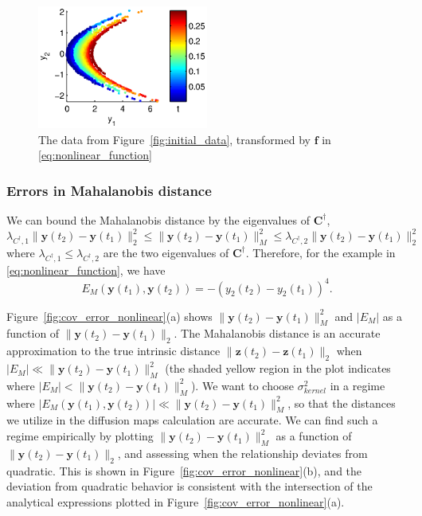 \begin{figure}[t]
\centering
\includegraphics[width=0.5\textwidth]{data_init_nonlinear}
%
\caption[Nonlinear multiscale data]{The data from Figure~\ref{fig:initial_data}, transformed by $\mathbf{f}$ in \eqref{eq:nonlinear_function}}
\label{fig:initial_data_nonlinear}
\end{figure}

\subsubsection{Errors in Mahalanobis distance}

We can bound the Mahalanobis distance by the eigenvalues of $\mathbf{C}^{\dagger}$,
\begin{equation}
\lambda_{C^{\dagger},1} \| \mathbf{y}(t_2) - \mathbf{y}(t_1) \|_2^2
\le
\| \mathbf{y}(t_2) - \mathbf{y}(t_1) \|^2_M
\le
\lambda_{C^{\dagger},2} \| \mathbf{y}(t_2) - \mathbf{y}(t_1) \|_2^2
\end{equation}
where $\lambda_{C^{\dagger},1} \le \lambda_{C^{\dagger},2}$ are the two eigenvalues of $\mathbf{C}^{\dagger}$.
%
Therefore, for the example in \eqref{eq:nonlinear_function}, we have
\begin{equation}
E_M(\mathbf{y}(t_1), \mathbf{y}(t_2)) = - (y_2(t_2) - y_2(t_1))^4.
\end{equation}

Figure~\ref{fig:cov_error_nonlinear}(a) shows $\| \mathbf{y}(t_2) - \mathbf{y}(t_1) \|^2_M$ and $| E_M |$ as a function of $\| \mathbf{y}(t_2) - \mathbf{y}(t_1) \|_2$.
%
The Mahalanobis distance is an accurate approximation to the true intrinsic distance $\| \mathbf{z}(t_2) - \mathbf{z}(t_1) \|_2$ when $|E_M| \ll \| \mathbf{y}(t_2) - \mathbf{y}(t_1) \|^2_M$ (the shaded yellow region in the plot indicates where $|E_M| < \| \mathbf{y}(t_2) - \mathbf{y}(t_1) \|^2_M$).
%
We want to choose $\sigma_{kernel}^2$ in a regime where $|E_M(\mathbf{y}(t_1), \mathbf{y}(t_2))| \ll \| \mathbf{y}(t_2) - \mathbf{y}(t_1) \|^2_M$, so that the distances we utilize in the diffusion maps calculation are accurate.
%
We can find such a regime empirically by plotting $\| \mathbf{y}(t_2) - \mathbf{y}(t_1) \|^2_M$ as a function of $\| \mathbf{y}(t_2) - \mathbf{y}(t_1) \|_2$, and assessing when the relationship deviates from quadratic.
%
This is shown in Figure~\ref{fig:cov_error_nonlinear}(b), and the deviation from quadratic behavior is consistent with the intersection of the analytical expressions plotted in Figure~\ref{fig:cov_error_nonlinear}(a).

